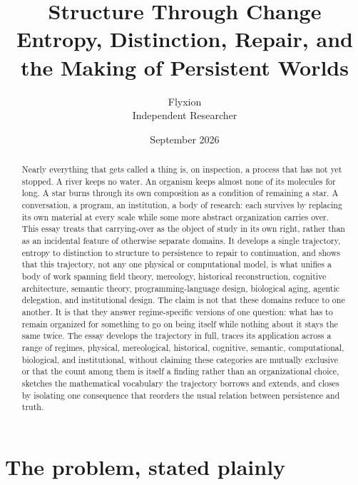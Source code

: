 \documentclass[11pt]{article}
\title{\textbf{Structure Through Change}\\[4pt]
\large Entropy, Distinction, Repair, and the Making of Persistent Worlds}
\author{Flyxion \\ \small Independent Researcher}
\date{September 2026}
\begin{document}
\maketitle

\begin{abstract}
\noindent Nearly everything that gets called a thing is, on inspection, a process that has not yet stopped. A river keeps no water. An organism keeps almost none of its molecules for long. A star burns through its own composition as a condition of remaining a star. A conversation, a program, an institution, a body of research: each survives by replacing its own material at every scale while some more abstract organization carries over. This essay treats that carrying-over as the object of study in its own right, rather than as an incidental feature of otherwise separate domains. It develops a single trajectory, entropy to distinction to structure to persistence to repair to continuation, and shows that this trajectory, not any one physical or computational model, is what unifies a body of work spanning field theory, mereology, historical reconstruction, cognitive architecture, semantic theory, programming-language design, biological aging, agentic delegation, and institutional design. The claim is not that these domains reduce to one another. It is that they answer regime-specific versions of one question: what has to remain organized for something to go on being itself while nothing about it stays the same twice. The essay develops the trajectory in full, traces its application across a range of regimes, physical, mereological, historical, cognitive, semantic, computational, biological, and institutional, without claiming these categories are mutually exclusive or that the count among them is itself a finding rather than an organizational choice, sketches the mathematical vocabulary the trajectory borrows and extends, and closes by isolating one consequence that reorders the usual relation between persistence and truth.
\end{abstract}

\tableofcontents

\section{The problem, stated plainly}
\end{document}
